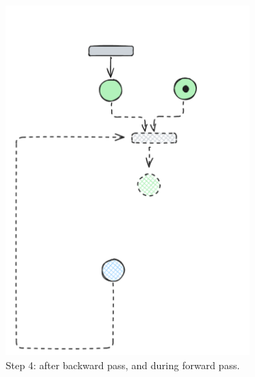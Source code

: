 \begin{figure}[htbp]
\begin{subfigure}[b]{0.23\textwidth}
		\includegraphics[width=\textwidth]{plots/bidirectional_pruning_step_d_updated_2.pdf}
		\caption{Step 4: after backward pass, and during forward pass.}
		\label{fig:step:d}
	\end{subfigure}\hfill
	\begin{subfigure}[b][\subfigheight][b]{0.23\textwidth}
		\centering

\end{subfigure}
\end{figure}
